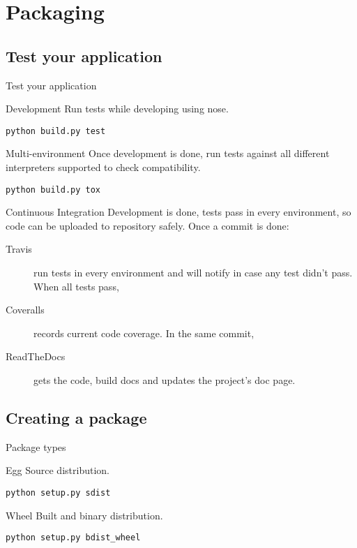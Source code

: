 \section{Packaging}
\subsection{Test your application}
\begin{frame}[fragile]{Test your application}
    \begin{block}{Development}
        Run tests while developing using nose.
        \begin{verbatim}
python build.py test
        \end{verbatim}
    \end{block}
    \pause
    \begin{block}{Multi-environment}
        Once development is done, run tests against all different interpreters supported to check compatibility.
        \begin{verbatim}
python build.py tox
        \end{verbatim}
    \end{block}
    \pause
    \begin{block}{Continuous Integration}
        Development is done, tests pass in every environment, so code can be uploaded to repository safely. Once a commit is done:
        \begin{description}
            \item[Travis] run tests in every environment and will notify in case any test didn't pass. When all tests pass,
            \item[Coveralls] records current code coverage. In the same commit,
            \item[ReadTheDocs] gets the code, build docs and updates the project's doc page.
        \end{description}
    \end{block}
\end{frame}

\subsection{Creating a package}
\begin{frame}[fragile]{Package types}
    \begin{block}{Egg}
        Source distribution.
        \begin{verbatim}
python setup.py sdist
        \end{verbatim}
    \end{block}
    \pause
    \begin{block}{Wheel}
        Built and binary distribution.
        \begin{verbatim}
python setup.py bdist_wheel
        \end{verbatim}
    \end{block}
\end{frame}

